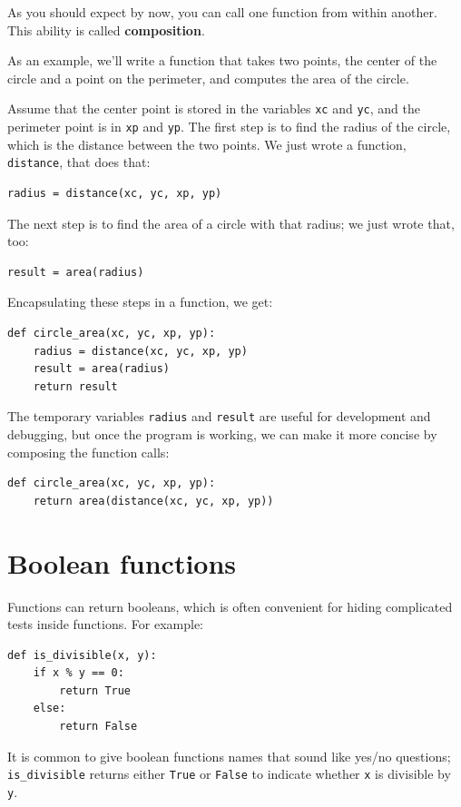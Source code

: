 \documentclass[10pt]{book}
\begin{document}
\begin{CJK}{UTF8}{gbsn}
As you should expect by now, you can call one function from
within another.  This ability is called {\bf composition}.

As an example, we'll write a function that takes two points,
the center of the circle and a point on the perimeter, and computes
the area of the circle.

Assume that the center point is stored in the variables {\tt xc} and
{\tt yc}, and the perimeter point is in {\tt xp} and {\tt yp}. The
first step is to find the radius of the circle, which is the distance
between the two points.  We just wrote a function, {\tt
distance}, that does that:

\begin{verbatim}
radius = distance(xc, yc, xp, yp)
\end{verbatim}
%
The next step is to find the area of a circle with that radius;
we just wrote that, too:

\begin{verbatim}
result = area(radius)
\end{verbatim}
%
Encapsulating these steps in a function, we get:

\begin{verbatim}
def circle_area(xc, yc, xp, yp):
    radius = distance(xc, yc, xp, yp)
    result = area(radius)
    return result
\end{verbatim}
%
The temporary variables {\tt radius} and {\tt result} are useful for
development and debugging, but once the program is working, we can
make it more concise by composing the function calls:

\begin{verbatim}
def circle_area(xc, yc, xp, yp):
    return area(distance(xc, yc, xp, yp))
\end{verbatim}
%

\section{Boolean functions}
\label{boolean}

Functions can return booleans, which is often convenient for hiding
complicated tests inside functions.  
For example:

\begin{verbatim}
def is_divisible(x, y):
    if x % y == 0:
        return True
    else:
        return False
\end{verbatim}
%
It is common to give boolean functions names that sound like yes/no
questions; \verb"is_divisible" returns either {\tt True} or {\tt False}
to indicate whether {\tt x} is divisible by {\tt y}.


\end{CJK}
\end{document}
